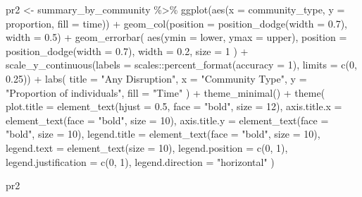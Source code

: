 \documentclass[
  letterpaper,
  DIV=11,
  numbers=noendperiod]{scrartcl}
\newenvironment{Shaded}{\begin{snugshade}}{\end{snugshade}}
\newcommand{\AttributeTok}[1]{\textcolor[rgb]{0.40,0.45,0.13}{#1}}
\newcommand{\DecValTok}[1]{\textcolor[rgb]{0.68,0.00,0.00}{#1}}
\newcommand{\FloatTok}[1]{\textcolor[rgb]{0.68,0.00,0.00}{#1}}
\newcommand{\FunctionTok}[1]{\textcolor[rgb]{0.28,0.35,0.67}{#1}}
\newcommand{\NormalTok}[1]{\textcolor[rgb]{0.00,0.23,0.31}{#1}}
\newcommand{\OtherTok}[1]{\textcolor[rgb]{0.00,0.23,0.31}{#1}}
\newcommand{\SpecialCharTok}[1]{\textcolor[rgb]{0.37,0.37,0.37}{#1}}
\newcommand{\StringTok}[1]{\textcolor[rgb]{0.13,0.47,0.30}{#1}}
\begin{document}
\begin{Shaded}
\begin{Highlighting}[]
\NormalTok{pr2 }\OtherTok{\textless{}{-}}\NormalTok{ summary\_by\_community }\SpecialCharTok{\%\textgreater{}\%} 
\FunctionTok{ggplot}\NormalTok{(}\FunctionTok{aes}\NormalTok{(}\AttributeTok{x =}\NormalTok{ community\_type, }\AttributeTok{y =}\NormalTok{ proportion, }\AttributeTok{fill =}\NormalTok{ time)) }\SpecialCharTok{+}
  \FunctionTok{geom\_col}\NormalTok{(}\AttributeTok{position =} \FunctionTok{position\_dodge}\NormalTok{(}\AttributeTok{width =} \FloatTok{0.7}\NormalTok{), }\AttributeTok{width =} \FloatTok{0.5}\NormalTok{) }\SpecialCharTok{+}
  \FunctionTok{geom\_errorbar}\NormalTok{(}
    \FunctionTok{aes}\NormalTok{(}\AttributeTok{ymin =}\NormalTok{ lower, }\AttributeTok{ymax =}\NormalTok{ upper),}
    \AttributeTok{position =} \FunctionTok{position\_dodge}\NormalTok{(}\AttributeTok{width =} \FloatTok{0.7}\NormalTok{),}
    \AttributeTok{width =} \FloatTok{0.2}\NormalTok{,}
    \AttributeTok{size =} \DecValTok{1}
\NormalTok{  ) }\SpecialCharTok{+}
  \FunctionTok{scale\_y\_continuous}\NormalTok{(}\AttributeTok{labels =}\NormalTok{ scales}\SpecialCharTok{::}\FunctionTok{percent\_format}\NormalTok{(}\AttributeTok{accuracy =} \DecValTok{1}\NormalTok{), }\AttributeTok{limits =} \FunctionTok{c}\NormalTok{(}\DecValTok{0}\NormalTok{, }\FloatTok{0.25}\NormalTok{)) }\SpecialCharTok{+}
  \FunctionTok{labs}\NormalTok{(}
    \AttributeTok{title =} \StringTok{"Any Disruption"}\NormalTok{,}
    \AttributeTok{x =} \StringTok{"Community Type"}\NormalTok{,}
    \AttributeTok{y =} \StringTok{"Proportion of individuals"}\NormalTok{,}
    \AttributeTok{fill =} \StringTok{"Time"}
\NormalTok{  ) }\SpecialCharTok{+}
  \FunctionTok{theme\_minimal}\NormalTok{() }\SpecialCharTok{+}
  \FunctionTok{theme}\NormalTok{(}
    \AttributeTok{plot.title =} \FunctionTok{element\_text}\NormalTok{(}\AttributeTok{hjust =} \FloatTok{0.5}\NormalTok{, }\AttributeTok{face =} \StringTok{"bold"}\NormalTok{, }\AttributeTok{size =} \DecValTok{12}\NormalTok{),}
    \AttributeTok{axis.title.x =} \FunctionTok{element\_text}\NormalTok{(}\AttributeTok{face =} \StringTok{"bold"}\NormalTok{, }\AttributeTok{size =} \DecValTok{10}\NormalTok{),}
    \AttributeTok{axis.title.y =} \FunctionTok{element\_text}\NormalTok{(}\AttributeTok{face =} \StringTok{"bold"}\NormalTok{, }\AttributeTok{size =} \DecValTok{10}\NormalTok{),}
    \AttributeTok{legend.title =} \FunctionTok{element\_text}\NormalTok{(}\AttributeTok{face =} \StringTok{"bold"}\NormalTok{, }\AttributeTok{size =} \DecValTok{10}\NormalTok{),}
    \AttributeTok{legend.text =} \FunctionTok{element\_text}\NormalTok{(}\AttributeTok{size =} \DecValTok{10}\NormalTok{),}
    \AttributeTok{legend.position =} \FunctionTok{c}\NormalTok{(}\DecValTok{0}\NormalTok{, }\DecValTok{1}\NormalTok{), }
    \AttributeTok{legend.justification =} \FunctionTok{c}\NormalTok{(}\DecValTok{0}\NormalTok{, }\DecValTok{1}\NormalTok{),}
    \AttributeTok{legend.direction =} \StringTok{"horizontal"}
\NormalTok{  )}

\NormalTok{pr2}
\end{Highlighting}
\end{Shaded}
\end{document}
